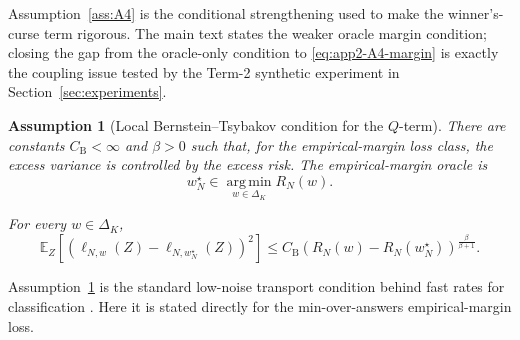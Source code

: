 \documentclass{article} %
\newtheorem{assumption}{Assumption}
\providecommand{\argmin}{\mathop{\mathrm{arg\,min}}\limits}
\providecommand{\simplex}{\Delta_K}
\providecommand{\Risk}{R}
\begin{document}
Assumption~\ref{ass:A4} is the conditional strengthening used to make the
winner's-curse term rigorous.  The main text states the weaker oracle margin
condition; closing the gap from the oracle-only condition to
\eqref{eq:app2-A4-margin} is exactly the coupling issue tested by the
Term-2 synthetic experiment in Section~\ref{sec:experiments}.

\begin{assumption}[Local Bernstein--Tsybakov condition for the \(Q\)-term]
\label{ass:A5}
There are constants \(C_{\mathrm B}<\infty\) and \(\beta>0\) such that, for the
empirical-margin loss class, the excess variance is controlled by the excess
risk.  The empirical-margin oracle is
\begin{equation}
\label{eq:app2-wNstar}
w_N^\star
\in
\argmin_{w\in\simplex}\Risk_N(w).
\end{equation}

For every \(w\in\simplex\),
\begin{equation}
\label{eq:app2-bernstein}
\mathbb E_Z
\left[
\left(
\ell_{N,w}(Z)-\ell_{N,w_N^\star}(Z)
\right)^2
\right]
\le
C_{\mathrm B}
\left(
\Risk_N(w)-\Risk_N(w_N^\star)
\right)^{\frac{\beta}{\beta+1}} .
\end{equation}
\end{assumption}

Assumption~\ref{ass:A5} is the standard low-noise transport condition behind
fast rates for classification \cite{mammen1999smooth,tsybakov2004optimal,
massart2006risk,bartlett2005local,koltchinskii2006local,audibert2005fastlr}.
Here it is stated directly for the min-over-answers empirical-margin loss.
\end{document}
